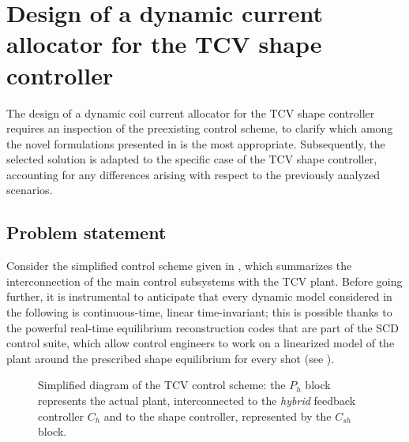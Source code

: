 \section{Design of a dynamic current allocator for the TCV shape controller}
\label{sec:tcvall}
The design of a dynamic coil current allocator for the TCV shape controller requires an inspection of the preexisting control scheme, to clarify which among the novel formulations presented in  is the most appropriate. Subsequently, the selected solution is adapted to the specific case of the TCV shape controller, accounting for any differences arising with respect to the previously analyzed scenarios.

\subsection{Problem statement}
\label{sec:tcvall_problem}
Consider the simplified control scheme given in , which summarizes the interconnection of the main control subsystems with the TCV plant. Before going further, it is instrumental to anticipate that every dynamic model considered in the following is continuous-time, linear time-invariant; this is possible thanks to the powerful real-time equilibrium reconstruction codes that are part of the SCD control suite, which allow control engineers to work on a linearized model of the plant around the prescribed shape equilibrium for every shot (see ).
\begin{figure}[t]
  \centering
  
  \caption{Simplified diagram of the TCV control scheme: the $P_h$ block represents the actual plant, interconnected to the \emph{hybrid} feedback controller $C_h$ and to the shape controller, represented by the $C_{sh}$ block.}
  \label{fig:tcvcsh}
\end{figure}

